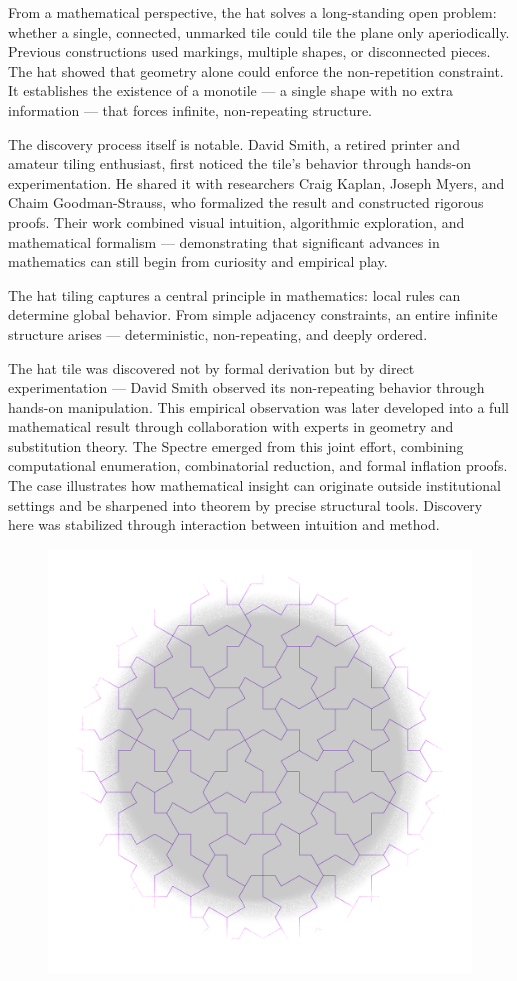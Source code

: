 From a mathematical perspective, the hat solves a long-standing open problem: whether a single, connected, unmarked tile could tile the plane only aperiodically. Previous constructions used markings, multiple shapes, or disconnected pieces. The hat showed that geometry alone could enforce the non-repetition constraint. It establishes the existence of a monotile — a single shape with no extra information — that forces infinite, non-repeating structure.

The discovery process itself is notable. David Smith, a retired printer and amateur tiling enthusiast, first noticed the tile’s behavior through hands-on experimentation. He shared it with researchers Craig Kaplan, Joseph Myers, and Chaim Goodman-Strauss, who formalized the result and constructed rigorous proofs. Their work combined visual intuition, algorithmic exploration, and mathematical formalism — demonstrating that significant advances in mathematics can still begin from curiosity and empirical play.

The hat tiling captures a central principle in mathematics: local rules can determine global behavior. From simple adjacency constraints, an entire infinite structure arises — deterministic, non-repeating, and deeply ordered.
\clearpage

\begin{commentary}
The hat tile was discovered not by formal derivation but by direct experimentation — David Smith observed its non-repeating behavior through hands-on manipulation. This empirical observation was later developed into a full mathematical result through collaboration with experts in geometry and substitution theory. The Spectre emerged from this joint effort, combining computational enumeration, combinatorial reduction, and formal inflation proofs. The case illustrates how mathematical insight can originate outside institutional settings and be sharpened into theorem by precise structural tools. Discovery here was stabilized through interaction between intuition and method.
\end{commentary}

\clearpage

\vspace{1em}
\begin{figure}[H]
\centering
\includegraphics[width=0.8\linewidth]{29_HatMonotile/Aperiodic tile - puzzle.png}
\end{figure}

\clearpage
